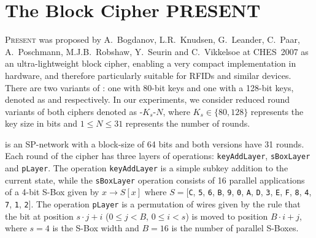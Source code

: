 \section{The Block Cipher PRESENT}
\label{sec:present}
\textsc{Present} \cite{present} was proposed by A.~Bogdanov, L.R.~Knudsen, G.~Leander, C.~Paar, A.~Posch\-mann, M.J.B.~Robshaw, Y.~Seurin and C.~Vikkelsoe at CHES~2007 as an ultra-lightweight block cipher, enabling a very compact implementation in hardware, and therefore particularly suitable for RFIDs and similar devices. There are two variants of \PRESENT: one with 80-bit keys and one with a 128-bit keys, denoted as  and  respectively. In our experiments, we consider reduced round variants of both ciphers denoted as
\PRESENT-$K_s$-$N$, where $K_s \in \{80, 128\}$ represents the key size in bits and $1 \leq N \leq 31$ represents the number of rounds.

\PRESENT is an SP-network with a block-size of 64 bits and both versions have 31 rounds. Each round of the cipher has three layers of operations:  \texttt{keyAddLayer}, \texttt{sBoxLayer} and \texttt{pLayer}. The operation \texttt{keyAddLayer} is a simple subkey addition to the
current state, while the \texttt{sBoxLayer} operation consists of 16 parallel applications of a 4-bit S-Box given by $x \rightarrow S[x]$ where $ S = $[\texttt{C}, \texttt{5}, \texttt{6}, \texttt{B}, \texttt{9}, \texttt{0}, \texttt{A}, \texttt{D}, \texttt{3}, \texttt{E}, \texttt{F}, \texttt{8}, \texttt{4}, \texttt{7}, \texttt{1}, \texttt{2}]. The operation \texttt{pLayer} is a permutation of wires given by the rule that the bit at position $s \cdot j + i$ ($0 \leq j < B$, $0 \leq i < s$) is moved to position $B \cdot i + j$, where $s=4$ is the S-Box width and $B=16$ is the number of parallel S-Boxes.

